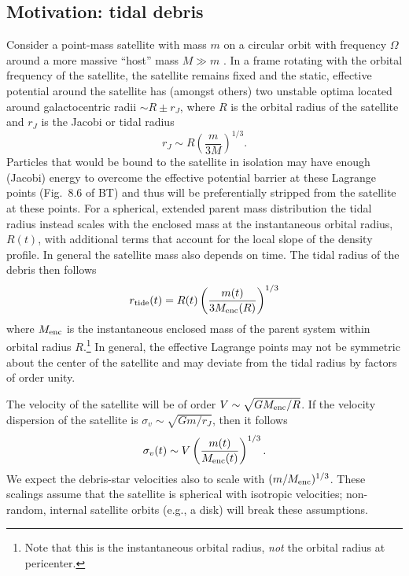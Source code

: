 \documentclass[letterpaper,12pt,preprint]{aastex}
\begin{document}
\subsection{Motivation: tidal debris}\label{sec:debris}

Consider a point-mass satellite with mass $m$ on a circular orbit with frequency $\Omega$ around a more massive ``host'' mass $M\gg m$ \citep[the ``restricted three-body problem''; e.g., \S 8.3][]{binneytremaine}. In a frame rotating with the orbital frequency of the satellite, the satellite remains fixed and the static, effective potential around the satellite has (amongst others) two unstable optima located around galactocentric radii $\sim R \pm r_J$, where $R$ is the orbital radius of the satellite and $r_J$ is the Jacobi or tidal radius
\begin{equation}
	r_J \sim R\left(\frac{m}{3M}\right)^{1/3}.\label{eq:ptmass}
\end{equation}
Particles that would be bound to the satellite in isolation may have enough (Jacobi) energy to overcome the effective potential barrier at these Lagrange points (Fig.~8.6 of BT) and thus will be preferentially stripped from the satellite at these points. For a spherical, extended parent mass distribution the tidal radius instead scales with the enclosed mass at the instantaneous orbital radius, $R(t)$, with additional terms that account for the local slope of the density profile. In general the satellite mass also depends on time. The tidal radius of the debris then follows
\begin{equation}
	r_{\rm tide}(t) = R(t)\left(\frac{m(t)}{3M_{\rm enc}(R)}\right)^{1/3}\label{eq:tidalradius}
\end{equation}
where $M_{\rm enc}$ is the instantaneous enclosed mass of the parent system within orbital radius $R$.\footnote{Note that this is the instantaneous orbital radius, \emph{not} the orbital radius at pericenter.}
In general, the effective Lagrange points may not be symmetric about the center of the satellite and may deviate from the tidal radius by factors of order unity. 

The velocity of the satellite will be of order $V\sim \sqrt{GM_{\rm enc}/R}$. If the velocity dispersion of the satellite is $\sigma_v \sim \sqrt{Gm/r_J}$, then it follows
\begin{equation}
	\sigma_v(t) \sim V\left(\frac{m(t)}{M_{\rm enc}(t)}\right)^{1/3}\label{eq:velscale}.
\end{equation}
We expect the debris-star velocities also to scale with $(m/M_{\rm enc})^{1/3}$. These scalings assume that the satellite is spherical with isotropic velocities; non-random, internal satellite orbits (e.g., a disk) will break these assumptions. 
\end{document}
